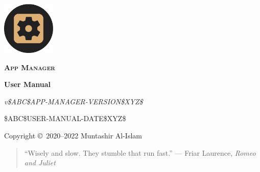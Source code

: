 \begin{titlingpage}
    \pagecolor{SunTan}
    \begin{center}
        \includegraphics[width=1in]{../images/icon}\par\vspace{1cm}
        {\Huge\textbf{\textsc{App Manager}}\par}
        \vspace{2.5cm}
        {\huge\bfseries User Manual\par}
        \vspace{.5cm}
        {\Large\itshape v\$ABC\$APP-MANAGER-VERSION\$XYZ\$\par}
        \vfill
        {\large \$ABC\$USER-MANUAL-DATE\$XYZ\$\par}
        \vfill
        {Copyright \copyright\ 2020--2022 Muntashir Al-Islam\par}
        \pagebreak
        \pagecolor{white}
        \begin{quotation}
            ``Wisely and slow. They stumble that run fast.''
                {--- Friar Laurence, \textit{Romeo and Juliet}}
        \end{quotation}
    \end{center}
\end{titlingpage}
